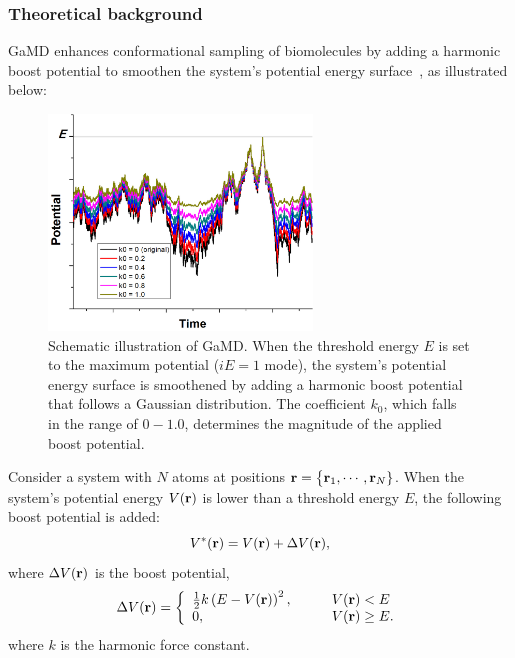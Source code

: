\subsubsection{Theoretical background}
GaMD enhances conformational sampling of biomolecules by adding a harmonic boost potential to smoothen the system's potential energy surface~\cite{MIAO2015mc}, as illustrated below:

\begin{figure}[!ht]
  \centering
  \includegraphics[width=7cm]{figures/GaMD-scheme.jpg}
  \caption{Schematic illustration of GaMD. When the threshold energy $E$ is set to the maximum potential ($iE=1$ mode), the system's potential energy surface is smoothened by adding a harmonic boost potential that follows a Gaussian distribution. The coefficient $k_0$, which falls in the range of $0 - 1.0$, determines the magnitude of the applied boost potential.}
  \label{fig:gamd_schematic}
\end{figure}

Consider a system with $N$ atoms at positions ${\bf r} = \big\{{\bf r}_1,\cdots,{\bf r}_N \}$. 
When the system's potential energy $V({\bf r})$ is lower than a threshold energy $E$, the following boost potential is added:
\begin{equation}
V^*({\bf r})= V({\bf r}) + \Delta V({\bf r}),
\end{equation}
where $\Delta V({\bf r})$ is the boost potential, 
\begin{equation} 
\Delta V({\bf r})= \left \{
\begin{array}{l l}
\frac{1}{2} k \left( E - V({\bf r}) \right)^2,  & \qquad V({\bf r})<E \\
0,   & \qquad V({\bf r})\geq E. \\  
\end{array} \right. 
\end{equation}
where $k$ is the harmonic force constant.

